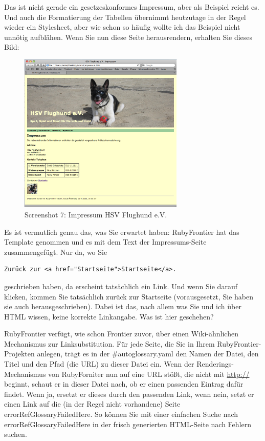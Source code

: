 \documentclass[11pt]{report}
\begin{document}
Das ist nicht gerade ein gesetzeskonformes Impressum, aber als
Beispiel reicht es. Und auch die Formatierung der Tabellen übernimmt
heutzutage in der Regel wieder ein Stylesheet, aber wie schon so
häufig wollte ich das Beispiel nicht unnötig aufblähen. Wenn Sie nun
diese Seite herausrendern, erhalten Sie dieses Bild:

\begin{figure}[h!]
\centering
\includegraphics[width=0.7\textwidth]{./images/flughund07.png}
\caption{\label{flughund07}Screenshot 7: Impressum HSV Flughund e.V.}
\end{figure}


Es ist vermutlich genau das, was Sie erwartet haben: RubyFrontier hat
das Template genommen und es mit dem Text der Impressums-Seite
zusammengefügt. Nur da, wo Sie


\begin{verbatim}
Zurück zur <a href="Startseite">Startseite</a>.
\end{verbatim}

geschrieben haben, da erscheint tatsächlich ein Link. Und wenn Sie
darauf klicken, kommen Sie tatsächlich zurück zur Startseite
(vorausgesetzt, Sie haben sie auch herausgeschrieben). Dabei ist das,
nach allem was Sie und ich über HTML wissen, keine korrekte
Linkangabe. Was ist hier geschehen?


RubyFrontier verfügt, wie schon Frontier zuvor, über einen
Wiki-ähnlichen Mechanismus zur Linksubstitution. Für jede Seite, die
Sie in Ihrem RubyFrontier-Projekten anlegen, trägt es in
der \#autoglossary.yaml den Namen der Datei, den Titel und den Pfad
(die URL) zu dieser Datei ein. Wenn der Renderings-Mechanismus von
RubyForniter nun auf eine URL stößt, die nicht mit \href{http://}{http://} beginnt,
schaut er in dieser Datei nach, ob er einen passenden Eintrag dafür
findet. Wenn ja, ersetzt er dieses durch den passenden Link, wenn
nein, setzt er einen Link auf die (in der Regel nicht vorhandene)
Seite errorRefGlossaryFailedHere. So können Sie mit einer einfachen
Suche nach errorRefGlossaryFailedHere in der frisch generierten
HTML-Seite nach Fehlern suchen.
\end{document}
